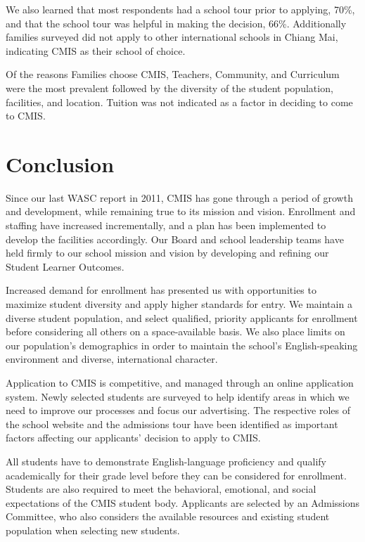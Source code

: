 
We also learned that most respondents had a school tour prior to applying, 70\%, and that the school tour was helpful in making the decision, 66\%. Additionally families surveyed did not apply to other international schools in Chiang Mai, indicating CMIS as their school of choice.

Of the reasons Families choose CMIS, Teachers, Community, and Curriculum were the most prevalent followed by the diversity of the student population, facilities, and location. Tuition was not indicated as a factor in deciding to come to CMIS.

\section{Conclusion}

Since our last WASC report in 2011, CMIS has gone through a period of growth and development, while remaining true to its mission and vision. Enrollment and staffing have increased incrementally, and a plan has been implemented to develop the facilities accordingly. Our Board and school leadership teams have held firmly to our school mission and vision by developing and refining our Student Learner Outcomes. 

Increased demand for enrollment has presented us with opportunities to maximize student diversity and apply higher standards for entry. We maintain a diverse student population, and select qualified, priority applicants for enrollment before considering all others on a space-available basis. We also place limits on our population's demographics in order to maintain the school's English-speaking environment and diverse, international character. 
 
Application to CMIS is competitive, and managed through an online application system. Newly selected students are surveyed to help identify areas in which we need to improve our processes and focus our advertising. The respective roles of the school website and the admissions tour have been identified as important factors affecting our applicants' decision to apply to CMIS. 

All students have to demonstrate English-language proficiency and qualify academically for their grade level before they can be considered for enrollment. Students are also required to meet the behavioral, emotional, and social expectations of the CMIS student body. Applicants are selected by an Admissions Committee, who also considers the available resources and existing student population when selecting new students.  

